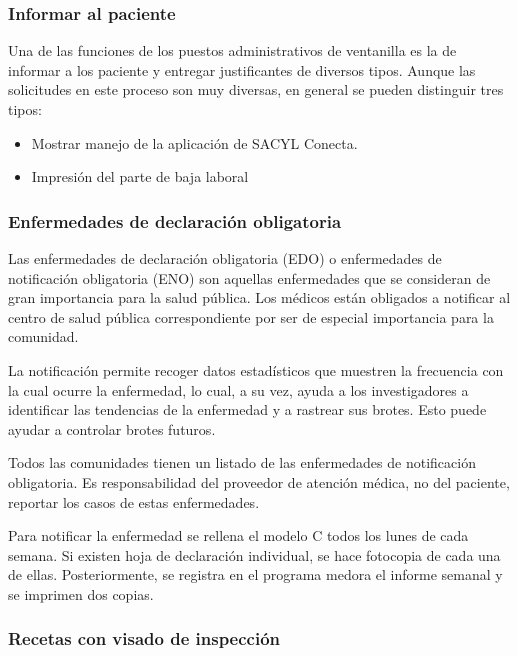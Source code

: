 \subsubsection{Informar al paciente}

Una de las funciones de los puestos administrativos de ventanilla es la de informar a los paciente y entregar justificantes de diversos tipos. Aunque las solicitudes en este proceso son muy diversas, en general se pueden distinguir tres tipos:

\begin{itemize}
    \item Mostrar manejo de la aplicación de SACYL Conecta.
    \item Impresión del parte de baja laboral
\end{itemize}

\subsubsection{Enfermedades de declaración obligatoria}

Las enfermedades de declaración obligatoria (EDO) o enfermedades de notificación obligatoria (ENO) son aquellas enfermedades que se consideran de gran importancia para la salud pública. Los médicos están obligados a notificar al centro de salud pública correspondiente por ser de especial importancia para la comunidad.

La notificación permite recoger datos estadísticos que muestren la frecuencia con la cual ocurre la enfermedad, lo cual, a su vez, ayuda a los investigadores a identificar las tendencias de la enfermedad y a rastrear sus brotes. Esto puede ayudar a controlar brotes futuros.

Todos las comunidades tienen un listado de las enfermedades de notificación obligatoria. Es responsabilidad del proveedor de atención médica, no del paciente, reportar los casos de estas enfermedades.

Para notificar la enfermedad se rellena el modelo C todos los lunes de cada semana.
Si existen hoja de declaración individual, se hace fotocopia de cada una de ellas.
Posteriormente, se registra en el programa \Gls{medora} el informe semanal y se imprimen dos copias.


\subsubsection{Recetas con visado de inspección}

